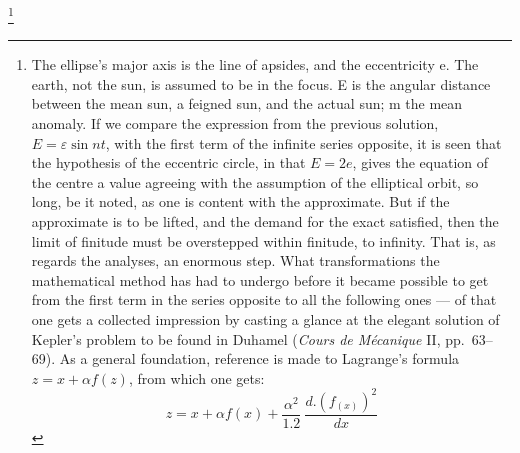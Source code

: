 \documentclass[12pt,a4paper]{book}
\begin{document}
\footnote{%
The ellipse's major axis is the line of apsides, and
the eccentricity e. The earth, not the sun, is assumed to be in the focus. E is the angular distance between
the mean sun, a feigned sun, and the actual sun; m the mean anomaly. If we compare the expression from the
previous solution, $E = \varepsilon \sin nt$, with the first term of the infinite series opposite, it is seen
that the hypothesis of the eccentric circle, in that
$E = 2 e$, gives the equation of the centre a value agreeing with the assumption of the elliptical orbit, so
long, be it noted, as one is content with the approximate. But if the approximate is to be lifted, and the
demand for the exact satisfied, then the limit of finitude must be overstepped within finitude, to infinity.
That is, as regards the analyses, an enormous step. What transformations the mathematical method has had to
undergo before it became possible to get from the first term in the series opposite to all the following ones
--- of that one gets a collected impression by casting a glance at the elegant solution of Kepler's problem to
be found
in Duhamel (\textit{Cours de Mécanique} II, pp.\ 63--69). As a general foundation, reference is made to
Lagrange's formula $z = x + \alpha f(z)$, from which one gets:
\[
z = x + \alpha f (x) + \frac{\alpha^{2}}{1.2}\ \frac{d.(f_{(x)})^{2}}{dx}
\]}
\end{document}
